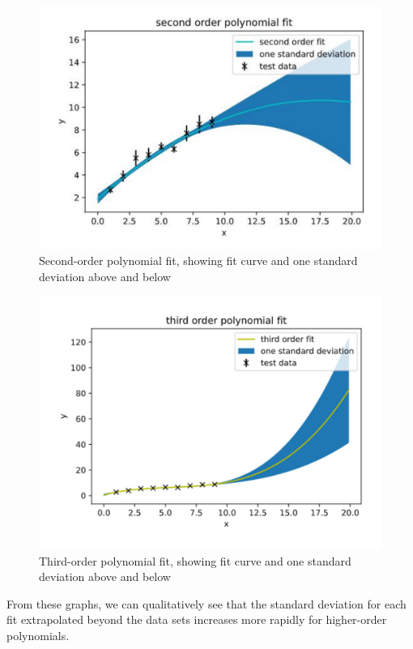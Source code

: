 \documentclass[a4paper]{article}
\begin{document}
\begin{figure}[h]
\centerline{\includegraphics[scale=0.3]{second_order.pdf}}
\caption{Second-order polynomial fit, showing fit curve and one standard deviation above and below}
\label{fig:secondorder}
\end{figure}
\newpage
\begin{figure}[h!]
\centerline{\includegraphics[scale=0.45]{third_order.pdf}}
\caption{Third-order polynomial fit, showing fit curve and one standard deviation above and below}
\label{fig:thirdorder}
\end{figure}
From these graphs, we can qualitatively see that the standard deviation for each fit extrapolated beyond the data sets increases more rapidly for higher-order polynomials.
\\\\
\end{document}
